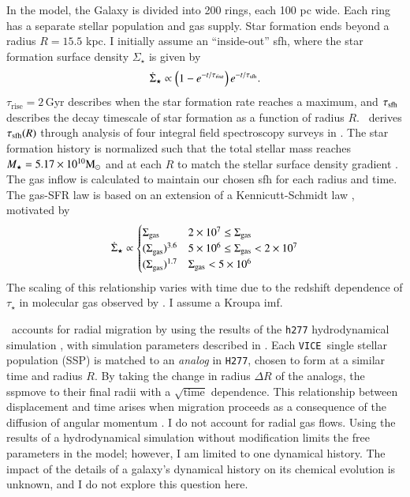 \documentclass[12pt,oneside,letterpaper]{report}
\newcommand{\sfh}{\gls{sfh}}
\newcommand{\ssp}{\gls{ssp}}
\newcommand{\imf}{\gls{imf}}
\newcommand{\JJ}{\citetalias{james+21}}
\newcommand{\VICE}{\texttt{VICE}}
\begin{document}
In the model, the Galaxy is divided into 200 rings, each 100 pc wide. Each ring has a separate stellar population and gas supply. Star formation ends beyond a radius $R=15.5$ kpc. I initially assume an ``inside-out'' \sfh{}, where the star formation surface density $\Sigma_\star$ is given by 
\begin{equation}
    \dot{\Sigma}_\star \propto \left(1-e^{-t/\tau_{\rm rise}}\right) e^{-t/\tau_{\rm sfh}}.
\end{equation}
$\tau_\text{rise}=2$\,Gyr describes when the star formation rate reaches a maximum, and $\tau_{\rm sfh}$ describes the decay timescale of star formation as a function of radius $R$. \JJ~derives $\tau_{\rm sfh}(R)$ through analysis of four integral field spectroscopy surveys in \cite{sanches20}. The star formation history is normalized such that the total stellar mass reaches $M_\star=5.17\times10^{10} {\rm M}_\odot$ \citep{LM15} and at each $R$ to match the stellar surface density gradient \citep{BHG16}.
The gas inflow is calculated to maintain our chosen \sfh{} for each radius and time. The gas-SFR law is based on an extension of a Kennicutt-Schmidt law \citep{kennicutt98}, motivated by 
\begin{equation}
\dot{\Sigma}_{\star} \propto 
\begin{cases}
    {\Sigma}_{\rm gas} & 2\times 10^7 \leq \Sigma_{\rm gas} \\ 
    {(\Sigma}_{\rm gas})^{3.6} & 5\times 10^6 \leq \Sigma_{\rm gas} < 2\times10^7 \\ 
    {(\Sigma}_{\rm gas})^{1.7} & \Sigma_{\rm gas} < 5\times10^6 \\ 
\end{cases}
\end{equation}
The scaling of this relationship varies with time due to the redshift dependence of $\tau_\star$ in molecular gas observed by \citet{tacconi18}. I assume a Kroupa \imf \cite{kroupa01}.


\JJ\ accounts for radial migration by using the results of the \texttt{h277} hydrodynamical simulation \citep{christensen12, zolotov12, loebman12, BZ14}, with simulation parameters described in \citet{bird+21}. Each \VICE\ single stellar population (SSP) is matched to an \textit{analog} in \texttt{H277}, chosen to form at a similar time and radius $R$. By taking the change in radius $\Delta R$ of the analogs, the \ssp move to their final radii with a $\sqrt{\text{time}}$ dependence.
This relationship between displacement and time arises when migration proceeds as a consequence of the diffusion of angular momentum \citep{frankel18, frankel20}.
I do not account for radial gas flows.
Using the results of a hydrodynamical simulation without modification limits the free parameters in the model; however, I am limited to one dynamical history. The impact of the details of a galaxy's dynamical history on its chemical evolution is unknown, and I do not explore this question here.
\end{document}
